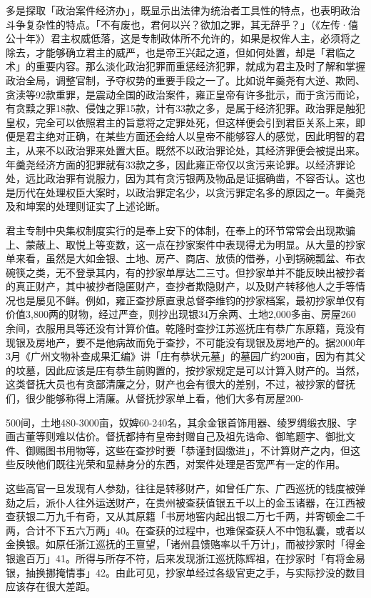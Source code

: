 \noindent 多是探取「政治案件经济办」，既显示出法律为统治者工具性的特点，也表明政治斗争复杂性的特点。「不有废也，君何以兴？欲加之罪，其无辞乎？」（《左传·僖公十年》）君主权威低落，这是专制政体所不允许的，如果是权侔人主，必须将之除去，才能够确立君主的威严，也是帝王兴起之道，但如何处置，却是「君临之术」的重要内容。那么淡化政治犯罪而重惩经济犯罪，就成为君主及时了解和掌握政治全局，调整官制，予夺权势的重要手段之一了。比如说年羹尧有大逆、欺罔、贪渎等92款重罪，是震动全国的政治案件，雍正皇帝有许多批示，而于贪污而论，有贪黩之罪18款、侵蚀之罪15款，计有33款之多，是属于经济犯罪。政治罪是触犯皇权，完全可以依照君主的旨意将之定罪处死，但这样便会引到君臣关系上来，即便是君主绝对正确，在某些方面还会给人以皇帝不能够容人的感觉，因此明智的君主，从来不以政治罪来处置大臣。既然不以政治罪论处，其经济罪便会被提出来。年羹尧经济方面的犯罪就有33款之多，因此雍正帝仅以贪污来论罪。以经济罪论处，远比政治罪有说服力，因为其有贪污银两及物品是证据确凿，不容否认。这也是历代在处理权臣大案时，以政治罪定名少，以贪污罪定名多的原因之一。年羹尧及和坤案的处理则证实了上述论断。

君主专制中央集权制度实行的是奉上安下的体制，在奉上的环节常常会出现欺骗上、蒙蔽上、取悦上等变数，这一点在抄家案件中表现得尤为明显。从大量的抄家单来看，虽然是大如金银、土地、房产、商店、放债的借券，小到锅碗瓢盆、布衣碗筷之类，无不登录其内，有的抄家单厚达二三寸。但抄家单并不能反映出被抄者的真正财产，其中被抄者隐匿财产，查抄者欺隐财产，以及财产转移他人之手等情况也是屡见不鲜。例如，雍正查抄原直隶总督李维钧的抄家档案，最初抄家单仅有价值3,800两的财物，经过严查，则抄出现银34万余两、土地2,000多亩、房屋260余间，衣服用具等还没有计算价值。乾隆时查抄江苏巡抚庄有恭广东原籍，竟没有现银及房地产，要不是他病故而免于查抄，不可能没有现银及房地产的。据2000年3月《广州文物补查成果汇编》讲「庄有恭状元墓」的墓园广约200亩，因为有其父的坟墓，因此应该是庄有恭生前购置的，按抄家规定是可以计算入财产的。当然，这类督抚大员也有贪鄙清廉之分，财产也会有很大的差别，不过，被抄家的督抚们，很少能够称得上清廉。从督抚抄家单上看，他们大多有房屋200-


\noindent 500间，土地480-3000亩，奴婢60-240名，其余金银首饰用器、绫罗绸缎衣服、字画古董等则难以估价。督抚都持有皇帝封赠自己及祖先诰命、御笔题字、御批文件、御赐图书用物等，这些在查抄时要「恭谨封固缴进」，不计算财产之内，但这些反映他们既往光荣和显赫身分的东西，对案件处理是否宽严有一定的作用。

这些高官一旦发现有人参劾，往往是转移财产，如曾任广东、广西巡抚的钱度被弹劾之后，派仆人往外运送财产，在贵州被查获值银五千以上的金玉诸器，在江西被查获银二万九千有奇，又从其原籍「书房地窖内起出银二万七千两，并寄顿金二千两，合计不下五六万两」40。在查获的过程中，也难保查获人不中饱私囊，或者以金换银。如原任浙江巡抚的王亶望，「诸州县馈赂率以千万计」，而被抄家时「得金银逾百万」41。所得与所存不符，后来发现浙江巡抚陈辉祖，在抄家时「有将金易银，抽换挪掩情事」42。由此可见，抄家单经过各级官吏之手，与实际抄没的数目应该存在很大差距。

